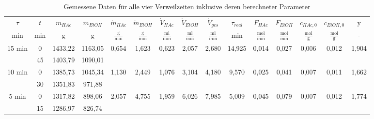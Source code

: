 \documentclass[12pt,liststotoc]{report}
\begin{document}
\begin{landscape}
\begin{table}[htbp]
  \centering
  \caption[Gemessene Daten für alle vier Verweilzeiten]{Gemessene Daten für alle vier Verweilzeiten inklusive deren berechneter Parameter}
    \begin{tabular}{ccccccccccccccc}
    \toprule
    $\tau$ & $t$   & $m_{HAc}$ & $m_{EtOH}$ & $\dot{m}_{HAc}$ & $\dot{m}_{EtOH}$ & $\dot{V}_{HAc}$ & $\dot{V}_{EtOH}$ & $\dot{V}_{ges}$ & $\tau_{real}$ & $F_{HAc}$ & $F_{EtOH}$ & $c_{HAc,0}$ & $c_{EtOH,0}$ & y \\
    min   & min   & g     & g     & $\frac{\text{g}}{\text{min}}$ & $\frac{\text{g}}{\text{min}}$ & $\frac{\text{ml}}{\text{min}}$ & $\frac{\text{ml}}{\text{min}}$ & $\frac{\text{ml}}{\text{min}}$ & min   & $\frac{\text{mol}}{\text{min}}$ & $\frac{\text{mol}}{\text{min}}$ & $\frac{\text{mol}}{\text{g}}$ & $\frac{\text{mol}}{\text{g}}$ & - \\
    \midrule
    \multirow{2}[2]{*}{15 min} & 0     & 1433,22 & 1163,05 & \multirow{2}[2]{*}{0,654} & \multirow{2}[2]{*}{1,623} & \multirow{2}[2]{*}{0,623} & \multirow{2}[2]{*}{2,057} & \multirow{2}[2]{*}{2,680} & \multirow{2}[2]{*}{14,925} & \multirow{2}[2]{*}{0,014} & \multirow{2}[2]{*}{0,027} & \multirow{2}[2]{*}{0,006} & \multirow{2}[2]{*}{0,012} & \multirow{2}[2]{*}{1,904} \\
          & 45    & 1403,79 & 1090,01 &       &       &       &       &       &       &       &       &       &       &  \\
    \midrule
    \multirow{2}[2]{*}{10 min} & 0     & 1385,73 & 1045,34 & \multirow{2}[2]{*}{1,130} & \multirow{2}[2]{*}{2,449} & \multirow{2}[2]{*}{1,076} & \multirow{2}[2]{*}{3,104} & \multirow{2}[2]{*}{4,180} & \multirow{2}[2]{*}{9,570} & \multirow{2}[2]{*}{0,025} & \multirow{2}[2]{*}{0,041} & \multirow{2}[2]{*}{0,007} & \multirow{2}[2]{*}{0,011} & \multirow{2}[2]{*}{1,662} \\
          & 30    & 1351,83 & 971,88 &       &       &       &       &       &       &       &       &       &       &  \\
    \midrule
    \multirow{2}[2]{*}{5 min} & 0     & 1317,82 & 898,06 & \multirow{2}[2]{*}{2,057} & \multirow{2}[2]{*}{4,755} & \multirow{2}[2]{*}{1,959} & \multirow{2}[2]{*}{6,026} & \multirow{2}[2]{*}{7,985} & \multirow{2}[2]{*}{5,009} & \multirow{2}[2]{*}{0,045} & \multirow{2}[2]{*}{0,079} & \multirow{2}[2]{*}{0,007} & \multirow{2}[2]{*}{0,012} & \multirow{2}[2]{*}{1,774} \\
          & 15    & 1286,97 & 826,74 &       &       &       &       &       &       &       &       &       &       &  \\

\end{tabular}
\end{table}
\end{landscape}
\end{document}

